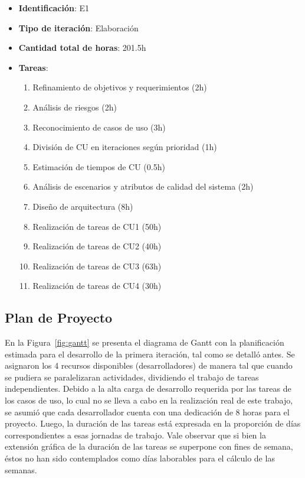 \begin{itemize}
\item \textbf{Identificación}: E1
\item \textbf{Tipo de iteración}: Elaboración
\item \textbf{Cantidad total de horas}: 201.5h
\item \textbf{Tareas}:
	\begin{enumerate}
	\item Refinamiento de objetivos y requerimientos (2h)
	\item Análisis de riesgos (2h)
	\item Reconocimiento de casos de uso (3h)
	\item División de CU en iteraciones según prioridad (1h)
	\item Estimación de tiempos de CU (0.5h)
	\item Análisis de escenarios y atributos de calidad del sistema (2h)
	\item Diseño de arquitectura (8h)
	\item Realización de tareas de CU1 (50h)
	\item Realización de tareas de CU2 (40h)
	\item Realización de tareas de CU3 (63h)
	\item Realización de tareas de CU4 (30h)
	\end{enumerate}
\end{itemize}

\subsection{Plan de Proyecto}

En la Figura~\ref{fig:gantt} se presenta el diagrama de Gantt con la planificación estimada para el desarrollo de la primera iteración, tal como se detalló antes. Se asignaron los 4 recursos disponibles (desarrolladores) de manera tal que cuando se pudiera se paralelizaran actividades, dividiendo el trabajo de tareas independientes. Debido a la alta carga de desarrollo requerida por las tareas de los casos de uso, lo cual no se lleva a cabo en la realización real de este trabajo, se asumió que cada desarrollador cuenta con una dedicación de 8 horas para el proyecto. Luego, la duración de las tareas está expresada en la proporción de días correspondientes a esas jornadas de trabajo. Vale observar que si bien la extensión gráfica de la duración de las tareas se superpone con fines de semana, éstos no han sido contemplados como días laborables para el cálculo de las semanas.


